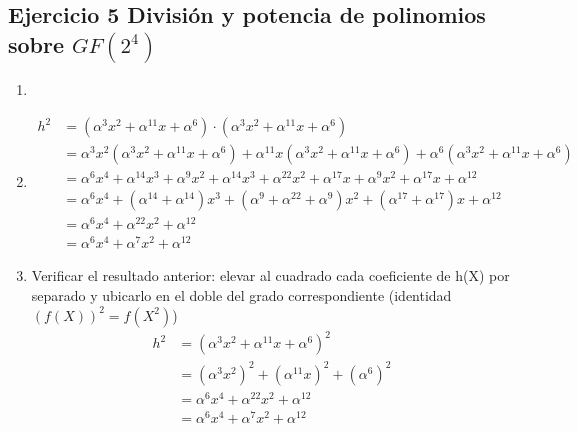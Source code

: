 \documentclass[11pt,fleqn]{article}
\begin{document}
\subsection*{Ejercicio 5 División y potencia de polinomios sobre $GF(2^4)$}
\begin{enumerate}[label=\alph*)]
\item {}

\EVa


\item {}
\begin{align*}
h^2
&=(\alpha^3x^2+\alpha^{11}x+\alpha^6)\cdot(\alpha^3x^2+\alpha^{11}x+\alpha^6)\\
&=\alpha^3x^2(\alpha^3x^2+\alpha^{11}x+\alpha^6)+\alpha^{11}x(\alpha^3x^2+\alpha^{11}x+\alpha^6)+\alpha^6(\alpha^3x^2+\alpha^{11}x+\alpha^6)\\
&=\alpha^6x^4+\alpha^{14}x^3+\alpha^9x^2+\alpha^{14}x^3+\alpha^{22}x^2+\alpha^{17}x+\alpha^9x^2+\alpha^{17}x+\alpha^{12}\\
&=\alpha^6x^4+(\alpha^{14}+\alpha^{14})x^3+(\alpha^9+\alpha^{22}+\alpha^9)x^2+(\alpha^{17}+\alpha^{17})x+\alpha^{12}\\
&=\alpha^6x^4+\alpha^{22}x^2+\alpha^{12}\\
&=\alpha^6x^4+\alpha^7x^2+\alpha^{12}
\end{align*}

\item Verificar el resultado anterior: elevar al cuadrado cada coeficiente de h(X) por separado y ubicarlo en el doble del grado correspondiente (identidad $(f(X))^2 = f(X^2)$)
\begin{align*}
h^2
&=(\alpha^3x^2+\alpha^{11}x+\alpha^6)^2\\
&=(\alpha^3x^2)^2+(\alpha^{11}x)^2+(\alpha^6)^2\\
&=\alpha^6x^4+\alpha^{22}x^2+\alpha^{12}\\
&=\alpha^6x^4+\alpha^{7}x^2+\alpha^{12}
\end{align*}

\end{enumerate}
\end{document}
